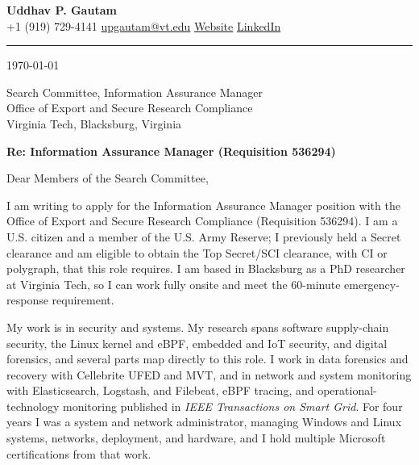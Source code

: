 \documentclass[11pt]{article}
\begin{document}
\begin{center}
{\LARGE\bfseries Uddhav P. Gautam}\\[0.4em]
{\small
+1 (919) 729-4141 \;\textbullet\;
\href{mailto:upgautam@vt.edu}{upgautam@vt.edu}
\;\textbullet\;
\href{https://uddhavpgautam.github.io}{Website}
\;\textbullet\;
\href{https://www.linkedin.com/in/uddhavpgautam/}{LinkedIn}
}
\end{center}

\vspace{3pt}
\hrule
\vspace{12pt}

\today

\vspace{8pt}

Search Committee, Information Assurance Manager\\
Office of Export and Secure Research Compliance\\
Virginia Tech, Blacksburg, Virginia

\vspace{6pt}
\textbf{Re: Information Assurance Manager (Requisition 536294)}

\vspace{6pt}
Dear Members of the Search Committee,

I am writing to apply for the Information Assurance Manager position with the Office of Export and Secure Research Compliance (Requisition 536294). I am a U.S. citizen and a member of the U.S. Army Reserve; I previously held a Secret clearance and am eligible to obtain the Top Secret/SCI clearance, with CI or polygraph, that this role requires. I am based in Blacksburg as a PhD researcher at Virginia Tech, so I can work fully onsite and meet the 60-minute emergency-response requirement.

My work is in security and systems. My research spans software supply-chain security, the Linux kernel and eBPF, embedded and IoT security, and digital forensics, and several parts map directly to this role. I work in data forensics and recovery with Cellebrite UFED and MVT, and in network and system monitoring with Elasticsearch, Logstash, and Filebeat, eBPF tracing, and operational-technology monitoring published in \textit{IEEE Transactions on Smart Grid}. For four years I was a system and network administrator, managing Windows and Linux systems, networks, deployment, and hardware, and I hold multiple Microsoft certifications from that work.
\end{document}
